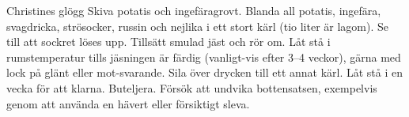 \documentclass{book}
\begin{document}
\thispagestyle{empty}

\begin{recipe}{Christines glögg}{}{}
  Skiva potatis och ingefära\newline grovt.
  Blanda all potatis, ingefära, svagdricka, strösocker, russin och nejlika i
  ett stort kärl (tio liter är lagom). Se till att sockret löses upp.
  Tillsätt smulad jäst och rör om.
  \newstep
  Låt stå i rumstemperatur tills jäsningen är färdig (vanligt-vis efter 3--4
  veckor), gärna med lock på glänt eller mot-svarande.
  \newstep
  Sila över drycken till ett annat kärl.
  \newstep
  Låt stå i en vecka för att klarna.
  \newstep
  Buteljera. Försök att undvika bottensatsen, exempelvis genom att använda en
  hävert eller försiktigt sleva.

\end{recipe}
\end{document}
